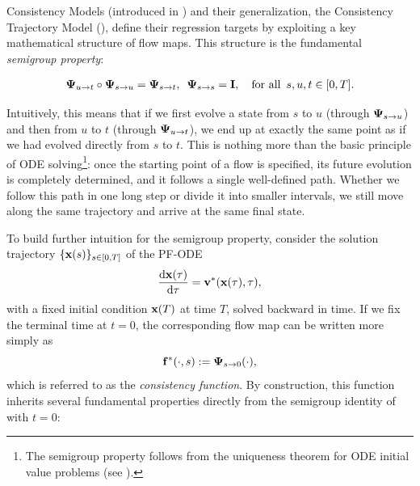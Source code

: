 Consistency Models (introduced in ) and their generalization, the Consistency Trajectory Model (), define their regression targets by exploiting a key mathematical structure of flow maps. 
This structure is the fundamental \emph{semigroup property}:
\begin{mdframed}
   \begin{align}\label{eq:semi-group}
       {\bm{\Psi}}_{u\to t}\circ {\bm{\Psi}}_{s\to u}={\bm{\Psi}}_{s\to t},
       \,\,\,
       {\bm{\Psi}}_{s\to s}={\mathbf{I}}, \quad \text{for all }\, s, u, t \in [0,T].
   \end{align} 
\end{mdframed}
Intuitively, this means that if we first evolve a state from $s$ to $u$ (through ${\bm{\Psi}}_{s\rightarrow u}$)  and then from $u$ to $t$ (through ${\bm{\Psi}}_{u\rightarrow t}$), we end up at exactly the same point as if we had evolved directly from $s$ to $t$. 
This is nothing more than the basic principle of ODE solving\footnote{The semigroup property follows from the uniqueness theorem for ODE initial value problems (see ).}: once the starting point of a flow is specified, its future evolution is completely determined, and it follows a single well-defined path. Whether we follow this path in one long step or divide it into smaller intervals, we still move along the same trajectory and arrive at the same final state.

To build further intuition for the semigroup property, consider the solution trajectory $\{{\mathbf{x}}(s)\}_{s \in [0,T]}$ of the PF-ODE
\begin{align*}
    \frac{\mathop{}\!\mathrm{d} {\mathbf{x}}(\tau)}{\mathop{}\!\mathrm{d} \tau} = {\mathbf{v}}^*({\mathbf{x}}(\tau), \tau),
\end{align*}
with a fixed initial condition ${\mathbf{x}}(T)$ at time $T$, solved backward in time.  
If we fix the terminal time at $t=0$, the corresponding flow map can be written more simply as
\[
{\mathbf{f}}^*(\cdot, s) := {\bm{\Psi}}_{s\to 0}(\cdot),
\]
which is referred to as the \emph{consistency function}.  
By construction, this function inherits several fundamental properties directly from the semigroup identity of  with $t=0$:

